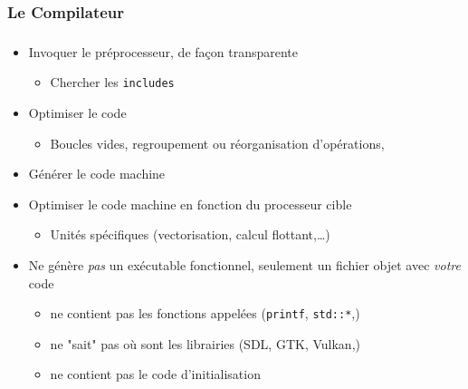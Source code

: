 \subsubsection{Le Compilateur}
\begin{frame}
\frametitle{\insertsubsubsection}
\begin{itemize}
  \item Invoquer le préprocesseur, de façon transparente
    \begin{itemize}
      \item Chercher les \texttt{includes}
    \end{itemize}
  \item Optimiser le code
    \begin{itemize}
      \item Boucles vides, regroupement ou réorganisation d'opérations,\…
    \end{itemize}
  \item Générer le code machine
  \item Optimiser le code machine en fonction du processeur cible
    \begin{itemize}
      \item Unités spécifiques (vectorisation, calcul flottant,…)
    \end{itemize}
  \item Ne génère \textit{pas} un exécutable fonctionnel, seulement un fichier objet avec \textit{votre} code
    \begin{itemize}
      \item ne contient pas les fonctions appelées (\texttt{printf}, \texttt{std::*},)
      \item ne "sait" pas où sont les librairies (SDL, GTK, Vulkan,\…)
      \item ne contient pas le code d'initialisation
    \end{itemize}
\end{itemize}

\end{frame}

